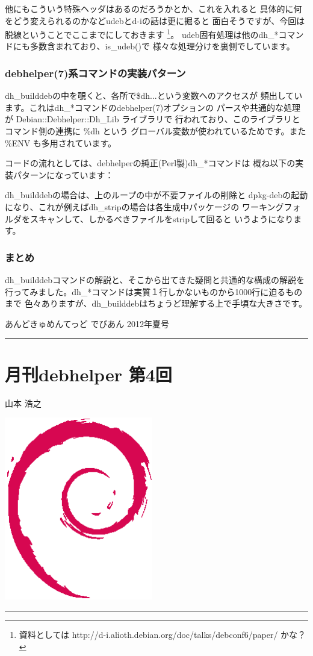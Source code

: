 \documentclass[mingoth,a4paper]{jsarticle}
\renewcommand{\dancersection}[2]{%
\newpage
あんどきゅめんてっど でびあん 2012年夏号
%
\vspace{0.1mm}\\
{\color{dancerdarkblue}\rule{\hsize}{2mm}}

%
%
\begin{minipage}[t]{0.6\hsize}
\color{dancerdarkblue}
\vspace{1cm}
\section{#1}
\hfill{}#2\\
\end{minipage}
\begin{minipage}[t]{0.4\hsize}
\vspace{-2cm}
\hfill{}\includegraphics[height=8cm]{image200502/openlogo-nd.eps}\\
\vspace{-5cm}
\end{minipage}
%
{\color{dancerlightblue}\rule{0.66\hsize}{2mm}}
%
\vspace{2cm}
}
\begin{document}
他にもこういう特殊ヘッダはあるのだろうかとか、これを入れると
具体的に何をどう変えられるのかなどudebとd-iの話は更に掘ると
面白そうですが、今回は脱線ということでここまでにしておきます
\footnote{
資料としては http://d-i.alioth.debian.org/doc/talks/debconf6/paper/ かな？
}。
udeb固有処理は他のdh\_*コマンドにも多数含まれており、is\_udeb()で
様々な処理分けを裏側でしています。

\subsubsection{debhelper(7)系コマンドの実装パターン}
dh\_builddebの中を覗くと、各所で\$dh{...}という変数へのアクセスが
頻出しています。これはdh\_*コマンドのdebhelper(7)オプションの
パースや共通的な処理が Debian::Debhelper::Dh\_Lib ライブラリで
行われており、このライブラリとコマンド側の連携に \%dh という
グローバル変数が使われているためです。また \%ENV も多用されています。

コードの流れとしては、debhelperの純正(Perl製)dh\_*コマンドは
概ね以下の実装パターンになっています：


dh\_builddebの場合は、上のループの中が不要ファイルの削除と
dpkg-debの起動になり、これが例えばdh\_stripの場合は各生成中パッケージの
ワーキングフォルダをスキャンして、しかるべきファイルをstripして回ると
いうようになります。

\subsubsection{まとめ}
dh\_builddebコマンドの解説と、そこから出てきた疑問と共通的な構成の解説を
行ってみました。dh\_*コマンドは実質１行しかないものから1000行に迫るものまで
色々ありますが、dh\_builddebはちょうど理解する上で手頃な大きさです。

\clearpage

\dancersection{月刊debhelper 第4回}{山本 浩之}
\end{document}
